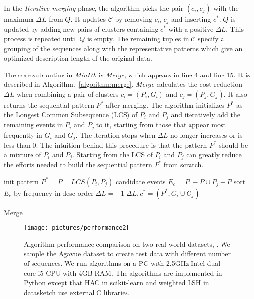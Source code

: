 In the \textit{Iterative merging} phase, the algorithm picks the pair $(c_i, c_j)$ with the maximum $\Delta L$ from $Q$. It updates $\mathscr{C}$ by removing $c_i$, $c_j$ and inserting $c^\ast$. $Q$ is updated by adding new pairs of clusters containing $c^\ast$ with a positive $\Delta L$. This process is repeated until $Q$ is empty. The remaining tuples in $\mathscr{C}$ specify a grouping of the sequences along with the representative patterns which give an optimized description length of the original data. 

The core subroutine in \textit{MinDL} is \textit{Merge}, which appears in line 4 and line 15. It is described in Algorithm.~\ref{algorithm:merge}. \textit{Merge} calculates the cost reduction $\Delta L$ when combining a pair of clusters $c_i=(P_i,G_i)$ and $c_j=(P_j,G_j)$. It also returns the sequential pattern $P^\ast$ after merging. The algorithm initializes $P^\ast$ as the Longest Common Subsequence (LCS) of $P_i$ and $P_j$ and iteratively add the remaining events in $P_i$ and $P_j$ to it, starting from those that appear most frequently in $G_i$ and $G_j$. The iteration stops when $\Delta L$ no longer increases or is less than 0. The intuition behind this procedure is that the pattern $P^\ast$ should be a mixture of $P_i$ and $P_j$. Starting from the LCS of $P_i$ and $P_j$ can greatly reduce the efforts needed to build the sequential pattern $P^\ast$ from scratch. 

\begin{algorithm}
	init pattern $P^\ast = P =LCS(P_i,P_j)$\;
	candidate events $E_c= P_i - P \cup P_j - P$\;
	sort $E_c$ by frequency in desc order\;
	$\Delta L = -1$\;
	\Return $\Delta L,c^\ast=(P^\ast, G_i \cup G_j)$
	\caption{Merge}
	\label{algorithm:merge}
\end{algorithm}  

\begin{figure*}
	\centering
	\texttt{[image: pictures/performance2]}
	\caption{Algorithm performance comparison on two real-world datasets, . We sample the Agavue dataset to create test data with different number of sequences. We run algorithms on a PC with 2.5GHz Intel dual-core i5 CPU with 4GB RAM. The algorithms are implemented in Python except that HAC in scikit-learn and weighted LSH in datasketch use external C libraries. 
		}
	\label{fig:performance}
\end{figure*}

